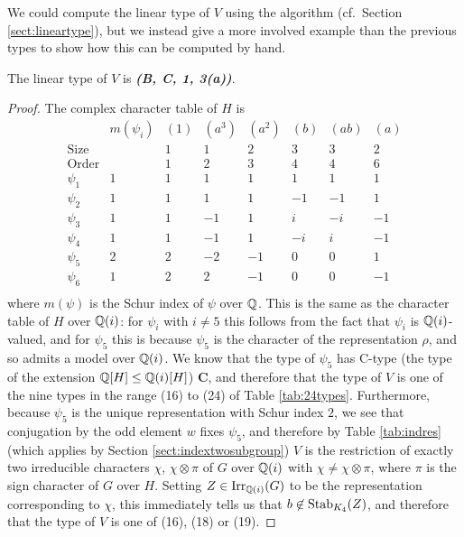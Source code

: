 We could compute the linear type of $V$ using the algorithm (cf.\ Section \ref{sect:lineartype}), but we instead give a more involved example than the previous types to show how this can be computed by hand.

\begin{lemma}
    The linear type of $V$ is \emph{\textbf{(B, C, 1, 3(a))}}.
\end{lemma}

\begin{proof}
The complex character table of $H$ is
\[
\begin{array}{c|c|rrrrrr}
 & m(\psi_i) & (1) & (a^3) & (a^2) & (b) & (ab) & (a) \\
\hline
\text{Size}  &   & 1 & 1 & 2 & 3 & 3 & 2 \\
\text{Order} &   & 1 & 2 & 3 & 4 & 4 & 6 \\
\hline
\psi_{1} & 1 & 1 & 1 & 1 & 1 & 1 & 1 \\
\psi_{2} & 1 & 1 & 1 & 1 & -1 & -1 & 1 \\
\psi_{3} & 1 & 1 & -1 & 1 & i & -i & -1 \\
\psi_{4} & 1 & 1 & -1 & 1 & -i & i & -1 \\
\psi_{5} & 2 & 2 & -2 & -1 & 0 & 0 & 1 \\
\psi_{6} & 1 & 2 & 2 & -1 & 0 & 0 & -1 \\
\end{array}
\]
where $m(\psi)$ is the Schur index of $\psi$ over ${\mathbb Q}$. This is the same as the character table of $H$ over ${\mathbb Q}(i)$: for $\psi_i$ with $i \neq 5$ this follows from the fact that $\psi_i$ is ${\mathbb Q}(i)$-valued, and for $\psi_5$ this is because $\psi_5$ is the character of the representation $\rho$, and so admits a model over ${\mathbb Q}(i)$. We know that the type of $\psi_5$ has C-type (the type of the extension ${\mathbb Q}[H] \leq {\mathbb Q}(i)[H]$) $\mathbf{C}$, and therefore that the type of $V$ is one of the nine types in the range (16) to (24) of Table \ref{tab:24types}. Furthermore, because $\psi_5$ is the unique representation with Schur index $2$, we see that conjugation by the odd element $w$ fixes $\psi_5$, and therefore by Table \ref{tab:indres} (which applies by Section \ref{sect:indextwosubgroup}) $V$ is the restriction of exactly two irreducible characters $\chi$, $\chi \otimes \pi$ of $G$ over ${\mathbb Q}(i)$ with $\chi \neq \chi \otimes \pi$, where $\pi$ is the sign character of $G$ over $H$. Setting $Z \in \operatorname{Irr}_{{\mathbb Q}(i)}(G)$ to be the representation corresponding to $\chi$, this immediately tells us that $b \not\in \operatorname{Stab}_{K_4}(Z)$, and therefore that the type of $V$ is one of (16), (18) or (19).


\end{proof}
